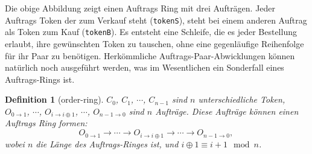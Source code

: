 \documentclass[UTF8,nofonts]{article}
\makeatletter
\newtheorem{definition}{Definition}[section]
\newenvironment{figurehere}
 {\def\@captype{figure}}
 {}
\makeatother
\begin{document}
\begin{multicols}{2}
\begin{center}
\begin{figurehere}

\caption{A order-ring of 3 Orders}
\label{fig:ring}
\end{figurehere}
\end{center}


Die obige Abbildung zeigt einen Auftrags Ring mit drei Aufträgen. Jeder Auftrags Token der zum Verkauf steht (\verb|tokenS|), steht bei einem anderen Auftrag als Token zum Kauf (\verb|tokenB|). Es entsteht eine Schleife, die es jeder Bestellung erlaubt, ihre gewünschten Token zu tauschen, ohne eine gegenläufige Reihenfolge für ihr Paar zu benötigen. Herkömmliche Auftrags-Paar-Abwicklungen können natürlich noch ausgeführt werden, was im Wesentlichen ein Sonderfall eines Auftrags-Rings ist.

\begin{definition}[order-ring] $C_{0}$, $C_{1}$, $\cdots$, $C_{n-1}$ sind $n$ unterschiedliche Token, $O_{0\rightarrow 1}$, $\cdots$, $O_{i\rightarrow i\oplus 1}$, $\cdots$, $O_{n-1 \rightarrow 0}$ sind $n$ Aufträge. Diese Aufträge können einen Auftrags Ring formen:
$$O_{0\rightarrow 1} \rightarrow \cdots \rightarrow O_{i\rightarrow i\oplus 1} \rightarrow \cdots \rightarrow O_{n-1\rightarrow 0} \text{, }$$
wobei $n$ die Länge des Auftrags-Ringes ist, und $i\oplus 1 \equiv i+1 \mod n$.
\end{definition}


\end{multicols}
\end{document}
